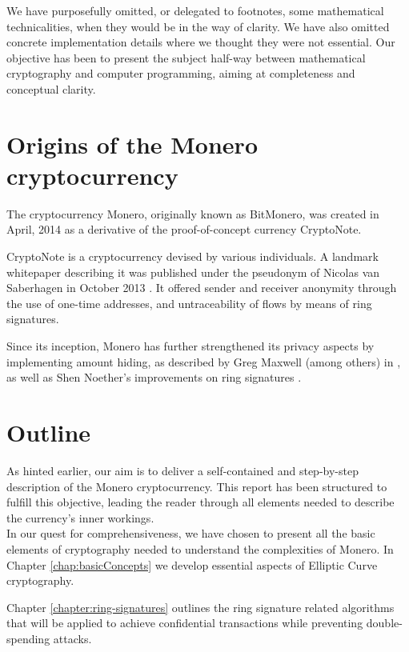 We have purposefully omitted, or delegated to footnotes, some mathematical technicalities, when they would be in the way of clarity. We have also omitted concrete implementation details where we thought they were not essential. Our objective has been to present the subject half-way between mathematical cryptography and computer programming, aiming at completeness and conceptual clarity.



\section{Origins of the Monero cryptocurrency}

The cryptocurrency Monero, originally known as BitMonero, was created in April, 2014 as a derivative of the proof-of-concept currency CryptoNote.

CryptoNote is a cryptocurrency devised by various individuals. A landmark whitepaper describing it was published under the pseudonym of Nicolas van Saberhagen in October 2013 \cite{cryptoNoteWhitePaper}. It offered sender and receiver anonymity through the use of one-time addresses, and untraceability of flows by means of ring signatures.

Since its inception, Monero has further strengthened its privacy aspects by implementing amount hiding, as described by Greg Maxwell (among others) in \cite{Signatures2015BorromeanRS}, as well as Shen Noether's improvements
on ring signatures \cite{ledger34}.
  

\section{Outline}

As hinted earlier, our aim is to deliver a self-contained and step-by-step description of the Monero cryptocurrency. This report has been structured to fulfill this objective, leading the reader through all elements needed to describe the currency’s inner workings.
\\

In our quest for comprehensiveness, we have chosen to present all the basic elements of cryptography needed to understand the complexities of Monero. In Chapter \ref{chap:basicConcepts} we develop essential aspects of Elliptic Curve cryptography.

Chapter \ref{chapter:ring-signatures} outlines the ring signature related algorithms that will be applied to achieve confidential transactions while preventing double-spending attacks.

